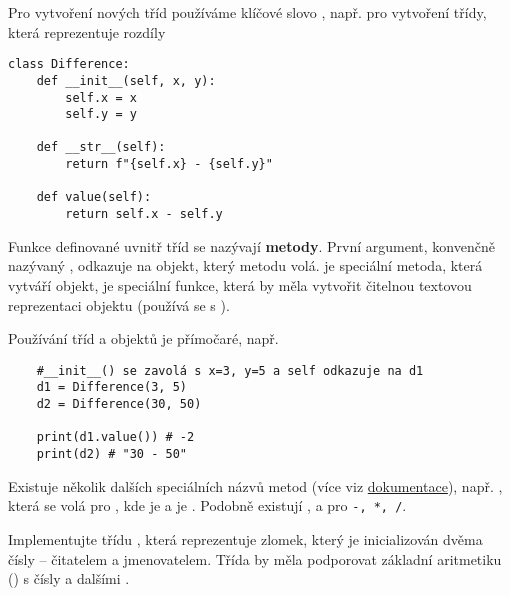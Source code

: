     Pro vytvoření nových tříd používáme klíčové slovo , např. pro vytvoření třídy, která reprezentuje rozdíly
\begin{lstlisting}
class Difference:
    def __init__(self, x, y):
        self.x = x
        self.y = y
        
    def __str__(self):
        return f"{self.x} - {self.y}"
    
    def value(self):
        return self.x - self.y
\end{lstlisting}
    Funkce definované uvnitř tříd se nazývají \textbf{metody}. První argument, konvenčně nazývaný , odkazuje na objekt, který metodu volá.  je speciální metoda, která vytváří objekt,  je speciální funkce, která by měla vytvořit čitelnou textovou reprezentaci objektu (používá se s ).

    Používání tříd a objektů je přímočaré, např.
\begin{lstlisting}
    #__init__() se zavolá s x=3, y=5 a self odkazuje na d1
    d1 = Difference(3, 5)
    d2 = Difference(30, 50) 

    print(d1.value()) # -2
    print(d2) # "30 - 50"
\end{lstlisting}

Existuje několik dalších speciálních názvů metod (více viz \href{https://docs.python.org/3/reference/datamodel.html#emulating-numeric-types}{dokumentace}),
např. , která se volá pro , kde  je  a  je . Podobně existují ,  a  pro \verb|-, *, /|.

\begin{exercise}
    Implementujte třídu , která reprezentuje zlomek, který je inicializován dvěma čísly -- čitatelem a jmenovatelem. Třída by měla podporovat základní aritmetiku (\ls{+,-,*,/}) s čísly a dalšími .
\end{exercise}